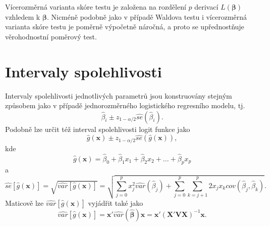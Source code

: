 Vícerozměrná varianta skóre testu je založena na rozdělení $p$ derivací $L(\pmb{\beta})$ vzhledem k $\pmb{\beta}$. Nicméně podobně jako v případě Waldova testu i vícerozměrná varianta skóre testu je poměrně výpočetně náročná, a proto se upřednostňuje věrohodnostní poměrový test.

\section{Intervaly spolehlivosti}

Intervaly spolehlivosti jednotlivých parametrů jsou konstruovány stejným způsobem jako v případě jednorozměrného logistického regresního modelu, tj.
\begin{equation}
\hat{\beta}_i \pm z_{1 - \alpha / 2}\widehat{se}(\hat{\beta}_i).
\end{equation}
Podobně lze určit též interval spolehlivosti logit funkce jako
\begin{equation}
\hat{g}(\pmb{x}) \pm z_{1 - \alpha / 2}\widehat{se}(\hat{g}(\pmb{x})),
\end{equation}
kde
\begin{equation}
\hat{g}(\pmb{x}) = \hat{\beta}_0 + \hat{\beta}_1 x_1 + \hat{\beta}_2 x_2 + ... + \hat{\beta}_p x_p
\end{equation}
a
\begin{equation}
\widehat{se}[\hat{g}(\pmb{x})] = \sqrt{\widehat{var}[\hat{g}(\pmb{x})]} = \sqrt{\sum_{j = 0}^p x^2_j \widehat{var}(\hat{\beta}_j) + \sum_{j = 0}^p \sum_{k = j + 1}^p 2 x_j x_k \widehat{cov}(\hat{\beta}_j, \hat{\beta}_k)}.
\end{equation}
Maticově lze $\widehat{var}[\hat{g}(\pmb{x})]$ vyjádřit také jako
\begin{equation}
\widehat{var}[\hat{g}(\pmb{x})] = \pmb{x}' \widehat{var}(\hat{\pmb{\beta}}) \pmb{x} = \pmb{x}' (\pmb{X'VX})^{-1} \pmb{x}.
\end{equation}